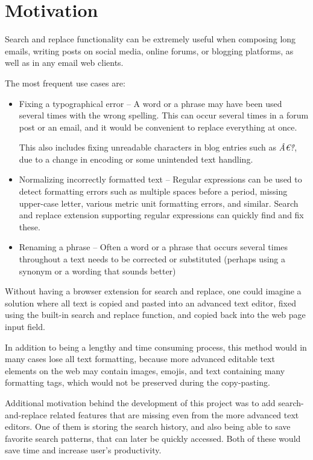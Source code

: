 \documentclass[bsc,frontabs,twoside,singlespacing,parskip,deptreport]{infthesis}
\begin{document}
\section{Motivation}
Search and replace functionality can be extremely useful when composing long emails, writing posts on social media, online forums, or blogging platforms, as well as in any email web clients. 

The most frequent use cases are:
\begin{itemize}
\item Fixing a typographical error -- A word or a phrase may have been used several times with the wrong spelling. This can occur several times in a forum post or an email, and it would be convenient to replace everything at once.

This also includes fixing unreadable characters in blog entries such as {\it \^{A}\euro\r{?}}, due to a change in encoding or some unintended text handling.

\item Normalizing incorrectly formatted text -- Regular expressions can be used to detect formatting errors such as multiple spaces before a period, missing upper-case letter, various metric unit formatting errors, and similar. Search and replace extension supporting regular expressions can quickly find and fix these.

\item Renaming a phrase -- Often a word or a phrase that occurs several times throughout a text needs to be corrected or substituted (perhaps using a synonym or a wording that sounds better)
\end{itemize}

Without having a browser extension for search and replace, one could imagine a solution where all text is copied and pasted into an advanced text editor, fixed using the built-in search and replace function, and copied back into the web page input field.

In addition to being a lengthy and time consuming process, this method would in many cases lose all text formatting, because more advanced editable text elements on the web may contain images, emojis, and text containing many formatting tags, which would not be preserved during the copy-pasting.

Additional motivation behind the development of this project was to add search-and-replace related features that are missing even from the more advanced text editors. One of them is storing the search history, and also being able to save favorite search patterns, that can later be quickly accessed. Both of these would save time and increase user's productivity.
\end{document}
